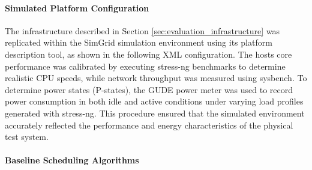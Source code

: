 \paragraph{Simulated Platform Configuration}
The infrastructure described in Section \ref{sec:evaluation_infrastructure} was replicated within the SimGrid simulation environment using its platform description tool, as shown in the following XML configuration. The hosts core performance was calibrated by executing stress-ng benchmarks to determine realistic CPU speeds, while network throughput was measured using sysbench. To determine power states (P-states), the GUDE power meter was used to record power consumption in both idle and active conditions under varying load profiles generated with stress-ng. This procedure ensured that the simulated environment accurately reflected the performance and energy characteristics of the physical test system.



\paragraph{Baseline Scheduling Algorithms}

